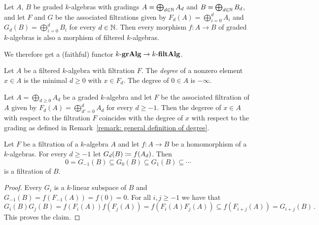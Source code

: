 \begin{example}
  Let $A$, $B$ be graded $k$-algebras with gradings $A = \bigoplus_{d \in \mathbb{N}} A_d$ and $B = \bigoplus_{d \in \mathbb{N}} B_d$, and let $F$ and $G$ be the associated filtrations given by $F_d(A) = \bigoplus_{i=0}^d A_i$ and $G_d(B) = \bigoplus_{i=0}^d B_i$ for every $d \in \mathbb{N}$.
  Then every morphism $f \colon A \to B$ of graded $k$-algebras is also a morphism of filtered $k$-algebras.
  
  We therefore get a (faithful) functor $k\text{-}\mathbf{grAlg} \to k\text{-}\mathbf{filtAlg}$.
\end{example}


\begin{definition}
  Let $A$  be a filtered $k$-algebra with filtration $F$.
  The \emph{degree} of a nonzero element $x \in A$ is the minimal $d \geq 0$ with $x \in F_d$.
  The degree of $0 \in A$ is $-\infty$.
\end{definition}


\begin{example}
  Let $A = \bigoplus_{d \geq 0} A_d$ be a graded $k$-algebra and let $F$ be the associated filtration of $A$ given by $F_d(A) = \bigoplus_{d'=0}^d A_d$ for every $d \geq -1$.
  Then the degeree of $x \in A$ with respect to the filtration $F$ coincides with the degree of $x$ with respect to the grading as defined in Remark~\ref{remark: general definition of degree}.
\end{example}


\begin{lemma}
  Let $F$ be a filtration of a $k$-algebra $A$ and let $f \colon A \to B$ be a homomorphism of a $k$-algebras.
  For every $d \geq -1$ let $G_d(B) \coloneqq f(A_d)$.
  Then
  \[
              0
    =         G_{-1}(B)
    \subseteq G_0(B)
    \subseteq G_1(B)
    \subseteq \dotsb
  \]
  is a filtration of $B$.
\end{lemma}


\begin{proof}
  Every $G_i$ is a $k$-linear subspace of $B$ and $G_{-1}(B) = f(F_{-1}(A)) = f(0) = 0$.
  For all $i, j \geq -1$ we have that
  \[
              G_i(B) G_j(B)
    =         f(F_i(A)) f(F_j(A))
    =         f( F_i(A) F_j(A) )
    \subseteq f( F_{i+j}(A) )
    =         G_{i+j}(B) \,.
  \]
  This proves the claim.
\end{proof}


